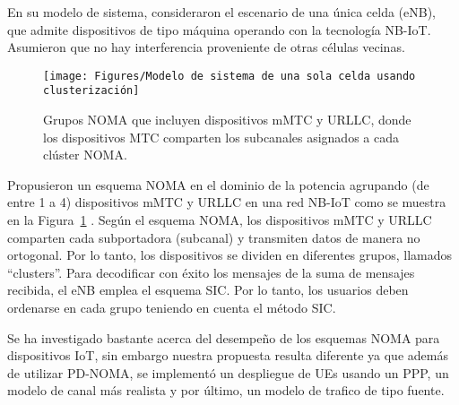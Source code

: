 En su modelo de sistema, consideraron el escenario de una única celda (eNB), que admite dispositivos de tipo máquina operando con la tecnología NB-IoT. Asumieron que no hay interferencia proveniente de otras células vecinas. \newline

\begin{figure}[th]
\centering
\texttt{[image: Figures/Modelo de sistema de una sola celda usando clusterización]}
\decoRule
\caption[Grupos NOMA que incluyen dispositivos mMTC y URLLC, donde los dispositivos MTC comparten los subcanales asignados a cada clúster NOMA.]{Grupos NOMA que incluyen dispositivos mMTC y URLLC, donde los dispositivos MTC comparten los subcanales asignados a cada clúster NOMA.}
\label{fig:NOMA_NBIOT}
\end{figure}

Propusieron un esquema NOMA en el dominio de la potencia agrupando (de entre 1 a 4) dispositivos mMTC y URLLC en una red NB-IoT como se muestra en la Figura~\ref{fig:NOMA_NBIOT} . Según el esquema NOMA, los dispositivos mMTC y URLLC comparten cada subportadora (subcanal) y transmiten datos de manera no ortogonal. Por lo tanto, los dispositivos se dividen en diferentes grupos, llamados ``clusters''. Para decodificar con éxito los mensajes de la suma de mensajes recibida, el eNB emplea el esquema SIC. Por lo tanto, los usuarios deben ordenarse en cada grupo teniendo en cuenta el método SIC.\newline

Se ha investigado bastante acerca del desempeño de los esquemas NOMA para dispositivos IoT, sin embargo nuestra propuesta resulta diferente ya que además de utilizar PD-NOMA, se implementó un despliegue de UEs usando un PPP, un modelo de canal más realista y por último, un modelo de trafico de tipo fuente.
